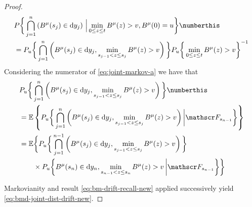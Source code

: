 \begin{proof}
	
	\begin{align*}
	&
		P \bigg\{ \bigcap_{j=1}^n \left( B^\mu(s_j) \in \mathrm d y_j \right) \,\Big \vert \min_{0\leq z \leq t} B^\mu(z)> v , B^\mu(0)=u \bigg \}
		\numberthis \label{eq:joint-markov-a}
		\\
		&
		= 
		P_u \bigg\{ \bigcap_{j=1}^n \left( B^\mu(s_j) \in \mathrm d y_j  ,  \min_{s_{j-1} < z \leq s_j} B^\mu(z)> v \right) 
		\bigg \}
		P_u \bigg\{
		 \min_{0\leq z \leq t} B^\mu(z)> v \bigg \} ^{-1
		 }
	\end{align*}
	Considering the numerator of \eqref{eq:joint-markov-a} we
	have that
	\begin{align*}
	&P_u \bigg\{ \bigcap_{j=1}^n \left( B^\mu(s_j) \in \mathrm d y_j  ,  \min_{s_{j-1} < z \leq s_j} B^\mu(z)> v \right) 
	\bigg \} \numberthis \label{eq:joint-markov-b}
	\\
	&= 
	\mathbb E \left\{
	P_u \bigg\{ \bigcap_{j=1}^n \left( B^\mu(s_j) \in \mathrm d y_j  ,  \min_{s_{j-1} < z \leq s_j} B^\mu(z)> v \right) 
	\bigg | \mathscr F_{s_{n-1}}
	\bigg \} 
	\right\}
	\\
	&=
	\mathbb E \bigg \{
	P_u 
	\bigg\{ \bigcap_{j=1}^{n-1} \left( B^\mu(s_j) \in \mathrm d y_j  ,  \min_{s_{j-1} < z \leq s_j} B^\mu(z)> v \right) 
	\bigg \} \\
	& \qquad \times 
	P_u \bigg\{   B^\mu(s_{n}) \in \mathrm d y_n  ,  \min_{s_{n-1} < z \leq s_n} B^\mu(z)> v  
	\, \bigg | \mathscr F_{s_{n-1}}
	\bigg \} 
	\bigg\}
	\end{align*}
	
	Markovianity and result \eqref{eq:bm-drift-recall-new} applied successively yield 
	\eqref{eq:bmd-joint-dist-drift-new}. 
\end{proof}

